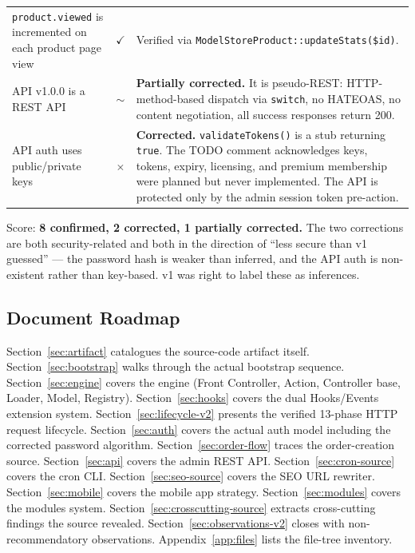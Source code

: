 \documentclass[11pt,a4paper]{article}
\begin{document}
\begin{table}[htbp]
{\begin{tabular}{>{\raggedright\arraybackslash}p{6.0cm}c>{\raggedright\arraybackslash}p{8.5cm}}
\texttt{product.viewed} is incremented on each product page view & \colorbox{nodefillgreen}{$\checkmark$} & Verified via \texttt{ModelStoreProduct::updateStats(\$id)}. \\
API v1.0.0 is a REST API & \colorbox{nodefillalt}{$\sim$} & \textbf{Partially corrected.} It is pseudo-REST: HTTP-method-based dispatch via \texttt{switch}, no HATEOAS, no content negotiation, all success responses return 200. \\
API auth uses public/private keys & \colorbox{nodefillalt}{$\times$} & \textbf{Corrected.} \texttt{validateTokens()} is a stub returning \texttt{true}. The TODO comment acknowledges keys, tokens, expiry, licensing, and premium membership were planned but never implemented. The API is protected only by the admin session token pre-action. \\
\bottomrule
\end{tabular}%
}
\end{table}

Score: \textbf{8 confirmed, 2 corrected, 1 partially corrected.} The
two corrections are both security-related and both in the direction of
``less secure than v1 guessed'' --- the password hash is weaker than
inferred, and the API auth is non-existent rather than key-based. v1
was right to label these as inferences.

\subsection{Document Roadmap}

Section~\ref{sec:artifact} catalogues the source-code artifact itself.
Section~\ref{sec:bootstrap} walks through the actual bootstrap sequence.
Section~\ref{sec:engine} covers the engine (Front Controller, Action,
Controller base, Loader, Model, Registry).
Section~\ref{sec:hooks} covers the dual Hooks/Events extension system.
Section~\ref{sec:lifecycle-v2} presents the verified 13-phase HTTP
request lifecycle. Section~\ref{sec:auth} covers the actual auth model
including the corrected password algorithm.
Section~\ref{sec:order-flow} traces the order-creation source.
Section~\ref{sec:api} covers the admin REST API.
Section~\ref{sec:cron-source} covers the cron CLI.
Section~\ref{sec:seo-source} covers the SEO URL rewriter.
Section~\ref{sec:mobile} covers the mobile app strategy.
Section~\ref{sec:modules} covers the modules system.
Section~\ref{sec:crosscutting-source} extracts cross-cutting findings
the source revealed. Section~\ref{sec:observations-v2} closes with
non-recommendatory observations. Appendix~\ref{app:files} lists the
file-tree inventory.
\end{document}
